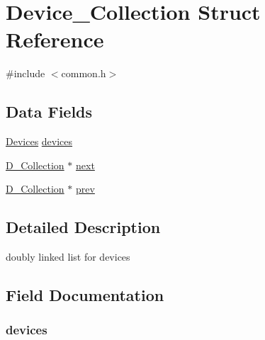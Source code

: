 \hypertarget{struct_device___collection}{}\section{Device\+\_\+\+Collection Struct Reference}
\label{struct_device___collection}


{\ttfamily \#include $<$common.\+h$>$}

\subsection*{Data Fields}
\begin{DoxyCompactItemize}
\item 
\hyperlink{common_8h_a2c6d82e48dafb528d22e1ab8b09637b2}{Devices} \hyperlink{struct_device___collection_ac451518cc6db3023ae782d6456bd29c5}{devices}
\item 
\hyperlink{common_8h_a78fbed7dbe1a9b59fa372944508fa48e}{D\+\_\+\+Collection} $\ast$ \hyperlink{struct_device___collection_ac816fce596139b2ee15a2cb1f9fe8a5e}{next}
\item 
\hyperlink{common_8h_a78fbed7dbe1a9b59fa372944508fa48e}{D\+\_\+\+Collection} $\ast$ \hyperlink{struct_device___collection_a300565259c9e3d05e7fc21bfdd76e41f}{prev}
\end{DoxyCompactItemize}


\subsection{Detailed Description}
doubly linked list for devices 

\subsection{Field Documentation}
\subsubsection[{\texorpdfstring{devices}{devices}}]{ devices}\hypertarget{struct_device___collection_ac451518cc6db3023ae782d6456bd29c5}{}\label{struct_device___collection_ac451518cc6db3023ae782d6456bd29c5}
